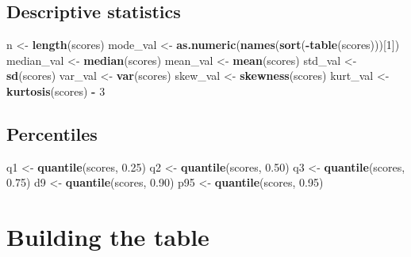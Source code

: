 \documentclass[
]{article}
\newenvironment{Shaded}{\begin{snugshade}}{\end{snugshade}}
\newcommand{\DecValTok}[1]{\textcolor[rgb]{0.00,0.00,0.81}{#1}}
\newcommand{\FloatTok}[1]{\textcolor[rgb]{0.00,0.00,0.81}{#1}}
\newcommand{\FunctionTok}[1]{\textcolor[rgb]{0.13,0.29,0.53}{\textbf{#1}}}
\newcommand{\NormalTok}[1]{#1}
\newcommand{\OtherTok}[1]{\textcolor[rgb]{0.56,0.35,0.01}{#1}}
\newcommand{\SpecialCharTok}[1]{\textcolor[rgb]{0.81,0.36,0.00}{\textbf{#1}}}
\begin{document}
\subsection{Descriptive statistics}\label{descriptive-statistics}

\begin{Shaded}
\begin{Highlighting}[]
\NormalTok{n }\OtherTok{\textless{}{-}} \FunctionTok{length}\NormalTok{(scores)}
\NormalTok{mode\_val }\OtherTok{\textless{}{-}} \FunctionTok{as.numeric}\NormalTok{(}\FunctionTok{names}\NormalTok{(}\FunctionTok{sort}\NormalTok{(}\SpecialCharTok{{-}}\FunctionTok{table}\NormalTok{(scores)))[}\DecValTok{1}\NormalTok{])}
\NormalTok{median\_val }\OtherTok{\textless{}{-}} \FunctionTok{median}\NormalTok{(scores)}
\NormalTok{mean\_val }\OtherTok{\textless{}{-}} \FunctionTok{mean}\NormalTok{(scores)}
\NormalTok{std\_val }\OtherTok{\textless{}{-}} \FunctionTok{sd}\NormalTok{(scores)}
\NormalTok{var\_val }\OtherTok{\textless{}{-}} \FunctionTok{var}\NormalTok{(scores)}
\NormalTok{skew\_val }\OtherTok{\textless{}{-}} \FunctionTok{skewness}\NormalTok{(scores)}
\NormalTok{kurt\_val }\OtherTok{\textless{}{-}} \FunctionTok{kurtosis}\NormalTok{(scores) }\SpecialCharTok{{-}} \DecValTok{3}  
\end{Highlighting}
\end{Shaded}

\subsection{Percentiles}\label{percentiles}

\begin{Shaded}
\begin{Highlighting}[]
\NormalTok{q1 }\OtherTok{\textless{}{-}} \FunctionTok{quantile}\NormalTok{(scores, }\FloatTok{0.25}\NormalTok{)}
\NormalTok{q2 }\OtherTok{\textless{}{-}} \FunctionTok{quantile}\NormalTok{(scores, }\FloatTok{0.50}\NormalTok{)}
\NormalTok{q3 }\OtherTok{\textless{}{-}} \FunctionTok{quantile}\NormalTok{(scores, }\FloatTok{0.75}\NormalTok{)}
\NormalTok{d9 }\OtherTok{\textless{}{-}} \FunctionTok{quantile}\NormalTok{(scores, }\FloatTok{0.90}\NormalTok{)}
\NormalTok{p95 }\OtherTok{\textless{}{-}} \FunctionTok{quantile}\NormalTok{(scores, }\FloatTok{0.95}\NormalTok{)}
\end{Highlighting}
\end{Shaded}

\section{Building the table}\label{building-the-table}
\end{document}
